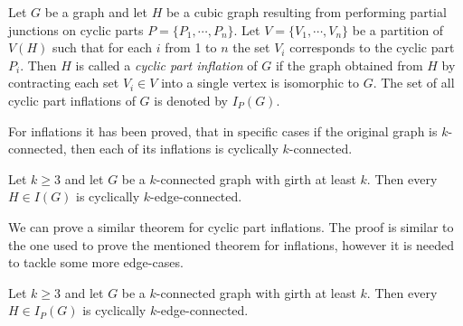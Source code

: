 \begin{definition}
	\label{def:cyclic-part-inflation}
	Let $G$ be a graph and let $H$ be a cubic graph resulting from performing partial junctions on cyclic parts $P=\{P_1,\cdots,P_n\}$. Let $V=\{V_1,\cdots, V_n\}$ be a partition of $V(H)$ such that for each $i$ from 1 to $n$ the set $V_i$ corresponds to the cyclic part $P_i$. Then $H$ is called a \textit{cyclic part inflation} of $G$ if the graph obtained from $H$ by contracting each set $V_i\in V$ into a single vertex is isomorphic to $G$. The set of all cyclic part inflations of $G$ is denoted by $I_P(G)$.
\end{definition}

For inflations it has been proved, that in specific cases if the original graph is $k$-connected, then each of its inflations is cyclically $k$-connected.

\begin{theorem}
	Let $k \geq 3$ and let $G$ be a $k$-connected graph with girth at least $k$. Then every $H \in I(G)$ is cyclically $k$-edge-connected.
\end{theorem}

We can prove a similar theorem for cyclic part inflations. The proof is similar to the one used to prove the mentioned theorem for inflations, however it is needed to tackle some more edge-cases.

\begin{theorem}
	Let $k\geq 3$ and let $G$ be a $k$-connected graph with girth at least $k$. Then every  $H\in I_P(G)$ is cyclically $k$-edge-connected.
\end{theorem}

